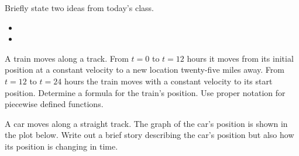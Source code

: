 \begin{problem}
\item Briefly state two ideas from today's class.
  \begin{itemize}
  \item 
  \item 
  \end{itemize}
\item A train moves along a track. From $t=0$ to $t=12$ hours it moves
  from its initial position at a constant velocity to a new location
  twenty-five miles away. From $t=12$ to $t=24$ hours the train moves
  with a constant velocity to its start position. Determine a formula
  for the train's position. Use proper notation for piecewise defined
  functions.
\item A car moves along a straight track. The graph of the car's
  position is shown in the plot below. Write out a brief story
  describing the car's position but also how its position is changing
  in time.


\end{problem}



